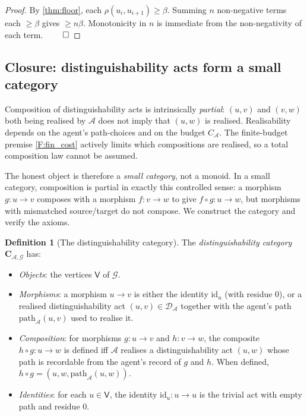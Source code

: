 \documentclass[11pt,twocolumn,a4paper]{article}
\theoremstyle{thmstyle}
\theoremstyle{definition}
\newtheorem{definition}[theorem]{Definition}
\theoremstyle{remark}
\newcommand{\Graph}{\mathcal{G}}
\newcommand{\Vrt}{\mathsf{V}}
\newcommand{\Agent}{\mathcal{A}}
\newcommand{\Res}{\rho}
\newcommand{\floor}{\beta}
\begin{document}
\begin{proof}
By \cref{thm:floor}, each $\Res(u_i, u_{i+1}) \geq \floor$. Summing
$n$ non-negative terms each $\geq \floor$ gives $\geq n\floor$.
Monotonicity in $n$ is immediate from the non-negativity of each
term. $\qed$
\end{proof}

\subsection{Closure: distinguishability acts form a small category}

Composition of distinguishability acts is intrinsically
\emph{partial}: $(u,v)$ and $(v,w)$ both being realised by $\Agent$
does not imply that $(u,w)$ is realised. Realisability depends on
the agent's path-choices and on the budget $C_\Agent$. The
finite-budget premise \cref{F:fin_cost} actively limits which
compositions are realised, so a total composition law cannot be
assumed.

The honest object is therefore a \emph{small category}, not a
monoid. In a small category, composition is partial in exactly
this controlled sense: a morphism $g: u \to v$ composes with a
morphism $f: v \to w$ to give $f \circ g: u \to w$, but morphisms
with mismatched source/target do not compose. We construct the
category and verify the axioms.

\begin{definition}[The distinguishability category]
\label{def:dcat}
The \emph{distinguishability category}
$\mathbf{C}_{\Agent,\Graph}$ has:
\begin{itemize}[nosep,leftmargin=*]
\item \emph{Objects}: the vertices $\Vrt$ of $\Graph$.
\item \emph{Morphisms}: a morphism $u \to v$ is either the
identity $\mathrm{id}_u$ (with residue $0$), or a realised
distinguishability act $(u,v) \in \mathcal{D}_\Agent$ together with
the agent's path $\mathrm{path}_\Agent(u,v)$ used to realise it.
\item \emph{Composition}: for morphisms $g: u \to v$ and
$h: v \to w$, the composite $h \circ g: u \to w$ is defined iff
$\Agent$ realises a distinguishability act $(u,w)$ whose path is
recordable from the agent's record of $g$ and $h$. When defined,
$h \circ g = (u, w, \mathrm{path}_\Agent(u,w))$.
\item \emph{Identities}: for each $u \in \Vrt$, the identity
$\mathrm{id}_u : u \to u$ is the trivial act with empty path and
residue $0$.
\end{itemize}
\end{definition}
\end{document}
